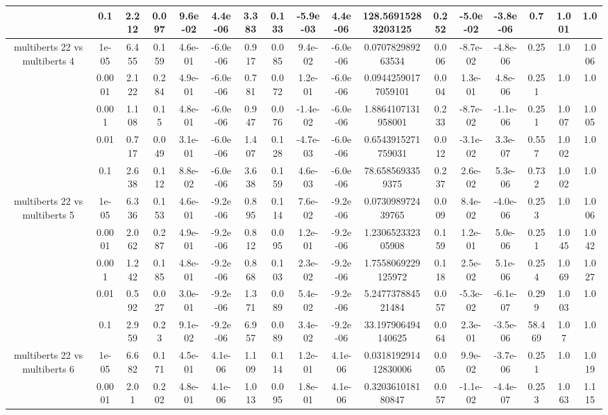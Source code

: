 \begin{tabular}{|c|c|c|c|c|c|c|c|c|c|c|c|c|c|c|c|c|}
 & 0.1 & 2.212 & 0.097 & 9.6e-02 & 4.4e-06 & 3.383 & 0.133 & -5.9e-03 & 4.4e-06 & 128.56915283203125 & 0.252 & -5.0e-02 & -3.8e-06 & 0.7 & 1.001 & 1.0 \\
\hline
\multirow{5}{*}{multiberts 22 vs multiberts 4} & 1e-05 & 6.455 & 0.159 & 4.6e-01 & -6.0e-06 & 0.917 & 0.085 & 9.4e-02 & -6.0e-06 & 0.070782989263534 & 0.006 & -8.7e-02 & -4.8e-06 & 0.25 & 1.0 & 1.006 \\
 & 0.0001 & 2.122 & 0.284 & 4.9e-01 & -6.0e-06 & 0.781 & 0.072 & 1.2e-01 & -6.0e-06 & 0.09442590177059101 & 0.004 & 1.3e-01 & 4.8e-06 & 0.251 & 1.0 & 1.0 \\
 & 0.001 & 1.108 & 0.15 & 4.8e-01 & -6.0e-06 & 0.947 & 0.076 & -1.4e-02 & -6.0e-06 & 1.8864107131958001 & 0.233 & -8.7e-02 & -1.1e-06 & 0.251 & 1.007 & 1.005 \\
 & 0.01 & 0.717 & 0.049 & 3.1e-01 & -6.0e-06 & 1.407 & 0.128 & -4.7e-03 & -6.0e-06 & 0.6543915271759031 & 0.012 & -3.1e-02 & 3.3e-07 & 0.557 & 1.002 & 1.0 \\
 & 0.1 & 2.638 & 0.112 & 8.8e-02 & -6.0e-06 & 3.638 & 0.159 & 4.6e-03 & -6.0e-06 & 78.6585693359375 & 0.237 & 2.6e-02 & 5.3e-06 & 0.732 & 1.002 & 1.0 \\
\hline
\multirow{5}{*}{multiberts 22 vs multiberts 5} & 1e-05 & 6.336 & 0.153 & 4.6e-01 & -9.2e-06 & 0.895 & 0.114 & 7.6e-02 & -9.2e-06 & 0.073098972439765 & 0.009 & 8.4e-02 & -4.0e-06 & 0.253 & 1.0 & 1.006 \\
 & 0.0001 & 2.062 & 0.287 & 4.9e-01 & -9.2e-06 & 0.812 & 0.095 & 1.2e-01 & -9.2e-06 & 1.230652332305908 & 0.159 & 1.2e-01 & 5.0e-06 & 0.251 & 1.045 & 1.042 \\
 & 0.001 & 1.242 & 0.185 & 4.8e-01 & -9.2e-06 & 0.868 & 0.103 & 2.3e-02 & -9.2e-06 & 1.7558069229125972 & 0.118 & 2.5e-02 & 5.1e-06 & 0.254 & 1.069 & 1.027 \\
 & 0.01 & 0.592 & 0.027 & 3.0e-01 & -9.2e-06 & 1.371 & 0.089 & 5.4e-02 & -9.2e-06 & 5.247737884521484 & 0.057 & -5.3e-02 & -6.1e-07 & 0.299 & 1.003 & 1.0 \\
 & 0.1 & 2.959 & 0.23 & 9.1e-02 & -9.2e-06 & 6.957 & 0.089 & 3.4e-02 & -9.2e-06 & 33.197906494140625 & 0.064 & 2.3e-01 & -3.5e-06 & 58.469 & 1.07 & 1.0 \\
\hline
\multirow{5}{*}{multiberts 22 vs multiberts 6} & 1e-05 & 6.682 & 0.171 & 4.5e-01 & 4.1e-06 & 1.109 & 0.114 & 1.2e-01 & 4.1e-06 & 0.031819291412830006 & 0.005 & 9.9e-02 & -3.7e-06 & 0.251 & 1.0 & 1.019 \\
 & 0.0001 & 2.01 & 0.202 & 4.8e-01 & 4.1e-06 & 1.013 & 0.095 & 1.8e-01 & 4.1e-06 & 0.320361018180847 & 0.057 & -1.1e-02 & -4.4e-07 & 0.253 & 1.063 & 1.115 \\

\end{tabular}
